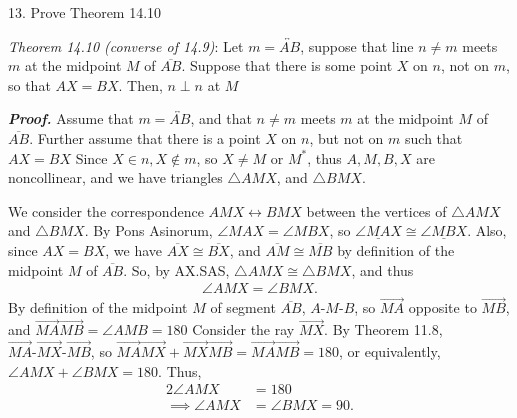 \documentclass{report}
\begin{document}
    \bigbreak \noindent 
    \begin{mdframed}
        13. Prove Theorem 14.10
    \end{mdframed}
    \bigbreak \noindent 
    \begin{remark}
        \textit{Theorem 14.10 (converse of 14.9)}: Let $m = \overleftrightarrow{AB}$, suppose that line $n\ne m$ meets $m$ at the midpoint $M$ of $\overline{AB}$. Suppose that there is some point $X$ on $n$, not on $m$, so that $AX = BX$. Then, $n \perp n$ at $M$
    \end{remark}
    \bigbreak \noindent 
    \textbf{\textit{Proof.}} Assume that $ m = \overleftrightarrow{AB}$, and that $ n \ne m$ meets $m$ at the midpoint $M$ of $\overline{AB}$. Further assume that there is a point $X$ on $n$, but not on $m$ such that $AX = BX$
    \bigbreak \noindent 
    Since $X \in n, X \not\in m$, so $X \ne M$ or $M^{*}$, thus $ A,M,B,X$ are noncollinear, and we have triangles $ \triangle AMX$, and $\triangle BMX$.
    \bigbreak \noindent 
    \begin{figure}[ht]
        \centering
        \label{fig:tri2}
    \end{figure}
    \bigbreak \noindent 
    We consider the correspondence $AMX \leftrightarrow BMX$ between the vertices of $\triangle AMX$ and $ \triangle BMX $.
    \bigbreak \noindent 
    By Pons Asinorum, $\angle MAX = \angle MBX$, so $\underline{\angle MAX} \cong \underline{\angle MBX}$. Also, since $AX = BX$, we have $\overline{AX} \cong \overline{BX}$, and $\overline{AM} \cong \overline{MB}$ by definition of the midpoint $M$ of $\overline{AB}$. So, by AX.SAS, $\triangle AMX \cong \triangle BMX$, and thus
    \begin{align*}
        \angle AMX = \angle BMX
    .\end{align*}
    By definition of the midpoint $M$ of segment $\overline{AB} $, $ A\text{-}M\text{-}B$, so $ \overrightarrow{MA}$ opposite to $ \overrightarrow{MB}$, and $\overrightarrow{MA}\overrightarrow{MB} = \angle AMB =180 $
    \bigbreak \noindent 
    Consider the ray $\overrightarrow{MX}$. By Theorem 11.8, $ \overrightarrow{MA}\text{-}\overrightarrow{MX}\text{-}\overrightarrow{MB} $, so $ \overrightarrow{MA}\overrightarrow{MX} + \overrightarrow{MX}\overrightarrow{MB} = \overrightarrow{MA}\overrightarrow{MB} = 180  $, or equivalently, $ \angle AMX + \angle BMX = 180$. Thus, 
    \begin{align*}
        2\angle AMX &= 180 \\
        \implies \angle AMX &= \angle BMX = 90
    .\end{align*}
\end{document}
